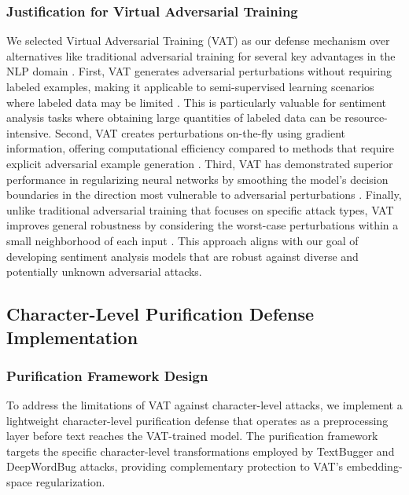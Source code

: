 \documentclass[../main.tex]{subfiles}
\begin{document}
\subsubsection{Justification for Virtual Adversarial Training}

We selected Virtual Adversarial Training (VAT) as our defense mechanism over alternatives like traditional adversarial training for several key advantages in the NLP domain \cite{miyato2017virtual}. First, VAT generates adversarial perturbations without requiring labeled examples, making it applicable to semi-supervised learning scenarios where labeled data may be limited \cite{miyato2017virtual}\cite{morris2020textattack}. This is particularly valuable for sentiment analysis tasks where obtaining large quantities of labeled data can be resource-intensive. Second, VAT creates perturbations on-the-fly using gradient information, offering computational efficiency compared to methods that require explicit adversarial example generation \cite{miyato2017virtual}. Third, VAT has demonstrated superior performance in regularizing neural networks by smoothing the model's decision boundaries in the direction most vulnerable to adversarial perturbations \cite{miyato2017virtual}. Finally, unlike traditional adversarial training that focuses on specific attack types, VAT improves general robustness by considering the worst-case perturbations within a small neighborhood of each input \cite{miyato2017virtual}\cite{morris2020textattack}. This approach aligns with our goal of developing sentiment analysis models that are robust against diverse and potentially unknown adversarial attacks.

\subsection{Character-Level Purification Defense Implementation}

\subsubsection{Purification Framework Design}

To address the limitations of VAT against character-level attacks, we implement a lightweight character-level purification defense that operates as a preprocessing layer before text reaches the VAT-trained model. The purification framework targets the specific character-level transformations employed by TextBugger and DeepWordBug attacks, providing complementary protection to VAT's embedding-space regularization.
\end{document}
